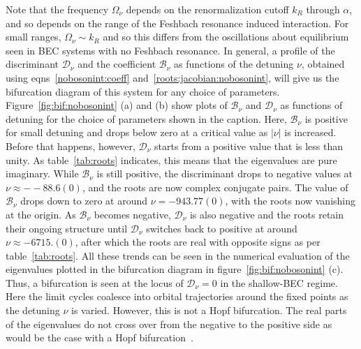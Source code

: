 \documentclass[a4paper,10pt]{article}
\begin{document}
 Note that the frequency $\Omega_\nu$ depends on the renormalization cutoff $k_R$ through $\alpha$, and so depends on the range of the Feshbach resonance induced interaction. For small ranges, $\Omega_\nu\sim k_R$ and so this differs from the oscillations about equilibrium seen in BEC systems with no Feshbach resonance. In general, a profile of the discriminant $\mathcal{D}_\nu$ and the coefficient $\mathcal{B}_\nu$ as functions of the detuning $\nu$, obtained using eqns~\ref{nobosonint:coeff} and~\ref{roots:jacobian:nobosonint}, will give us the bifurcation diagram of this system for any choice of parameters. Figure~\ref{fig:bif:nobosonint} (a) and (b) show plots of $\mathcal{B}_\nu$ and $\mathcal{D}_\nu$ as functions of detuning for the choice of parameters shown in the caption. Here, $\mathcal{B}_\nu$ is positive for small detuning and drops below zero at a critical value as $|\nu|$ is increased. Before that happens, however, $\mathcal{D}_\nu$ starts from a positive value that is less than unity. As table~\ref{tab:roots} indicates, this means that the eigenvalues are pure imaginary. While $\mathcal{B}_\nu$ is still positive, the discriminant drops to negative values at $\nu\approx--88.6(0)$, and the roots  are now complex conjugate pairs. The value of $\mathcal{B}_\nu$ drops down to zero at around $\nu=-943.77(0)$, with the roots now vanishing at the origin. As $\mathcal{B}_\nu$ becomes negative, $\mathcal{D}_\nu$ is also negative and the roots retain their ongoing structure until $\mathcal{D}_\nu$ switches back to positive at around $\nu\approx-6715.(0)$, after which the roots are real with opposite signs as per table~\ref{tab:roots}. All these trends can be seen in the numerical evaluation of the eigenvalues plotted in the bifurcation diagram in figure~\ref{fig:bif:nobosonint} (c). Thus, a bifurcation is seen at the locus of $\mathcal{D}_\nu=0$ in the shallow-BEC regime. Here the limit cycles coalesce into orbital trajectories around the fixed points as the detuning $\nu$ is varied. However, this is not a Hopf bifurcation. The real parts of the eigenvalues do not cross over from the negative to the positive side as would be the case with a Hopf bifurcation~\cite{strogatz:book}. 
\end{document}
